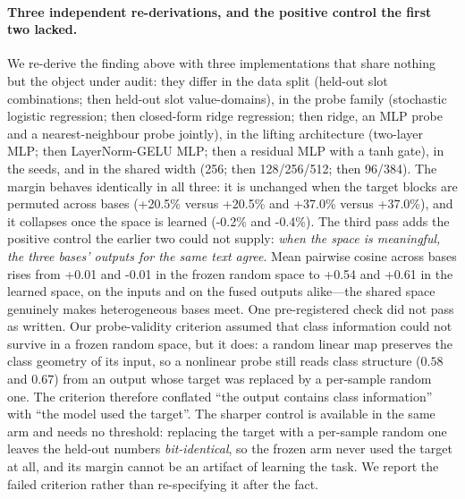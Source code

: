 \documentclass[10pt]{article}
\theoremstyle{definition}
\theoremstyle{plain}
\theoremstyle{remark}
\begin{document}
\paragraph{Three independent re-derivations, and the positive control the first two lacked.} We re-derive the finding above with three implementations that share nothing but the object under audit: they differ in the data split (held-out slot combinations; then held-out slot value-domains), in the probe family (stochastic logistic regression; then closed-form ridge regression; then ridge, an MLP probe and a nearest-neighbour probe jointly), in the lifting architecture (two-layer MLP; then LayerNorm-GELU MLP; then a residual MLP with a tanh gate), in the seeds, and in the shared width (256; then 128/256/512; then 96/384). The margin behaves identically in all three: it is unchanged when the target blocks are permuted across bases (+20.5\% versus +20.5\% and +37.0\% versus +37.0\%), and it collapses once the space is learned (-0.2\% and -0.4\%). The third pass adds the positive control the earlier two could not supply: \emph{when the space is meaningful, the three bases' outputs for the same text agree}. Mean pairwise cosine across bases rises from +0.01 and -0.01 in the frozen random space to +0.54 and +0.61 in the learned space, on the inputs and on the fused outputs alike---the shared space genuinely makes heterogeneous bases meet. One pre-registered check did not pass as written. Our probe-validity criterion assumed that class information could not survive in a frozen random space, but it does: a random linear map preserves the class geometry of its input, so a nonlinear probe still reads class structure ($0.58$ and $0.67$) from an output whose target was replaced by a per-sample random one. The criterion therefore conflated ``the output contains class information'' with ``the model used the target''. The sharper control is available in the same arm and needs no threshold: replacing the target with a per-sample random one leaves the held-out numbers \emph{bit-identical}, so the frozen arm never used the target at all, and its margin cannot be an artifact of learning the task. We report the failed criterion rather than re-specifying it after the fact.
\end{document}
